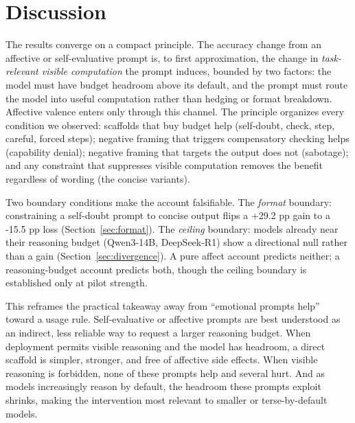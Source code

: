 \documentclass{article}
\begin{document}


\section{Discussion}
The results converge on a compact principle. The accuracy change from an affective or self-evaluative prompt is, to first approximation, the change in \textit{task-relevant visible computation} the prompt induces, bounded by two factors: the model must have budget headroom above its default, and the prompt must route the model into useful computation rather than hedging or format breakdown. Affective valence enters only through this channel. The principle organizes every condition we observed: scaffolds that buy budget help (self-doubt, check, step, careful, forced steps); negative framing that triggers compensatory checking helps (capability denial); negative framing that targets the output does not (sabotage); and any constraint that suppresses visible computation removes the benefit regardless of wording (the concise variants).

Two boundary conditions make the account falsifiable. The \emph{format} boundary: constraining a self-doubt prompt to concise output flips a +29.2 pp gain to a -15.5 pp loss (Section~\ref{sec:format}). The \emph{ceiling} boundary: models already near their reasoning budget (Qwen3-14B, DeepSeek-R1) show a directional null rather than a gain (Section~\ref{sec:divergence}). A pure affect account predicts neither; a reasoning-budget account predicts both, though the ceiling boundary is established only at pilot strength.

This reframes the practical takeaway away from ``emotional prompts help'' toward a usage rule. Self-evaluative or affective prompts are best understood as an indirect, less reliable way to request a larger reasoning budget. When deployment permits visible reasoning and the model has headroom, a direct scaffold is simpler, stronger, and free of affective side effects. When visible reasoning is forbidden, none of these prompts help and several hurt. And as models increasingly reason by default, the headroom these prompts exploit shrinks, making the intervention most relevant to smaller or terse-by-default models.
\end{document}
